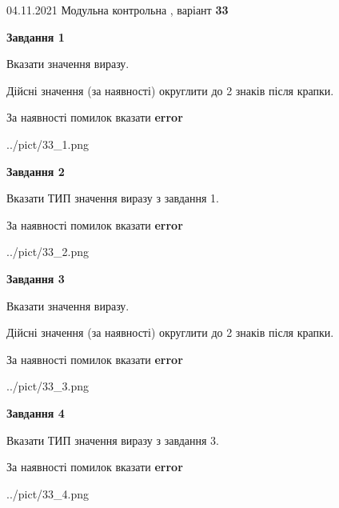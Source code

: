\documentclass[11pt, ukrainian]{article}
\begin{document}
{04.11.2021 Модульна контрольна , варіант  \No \textbf { 33 }\par}
{
\begin {large}
{\begin {center}\textbf{Завдання 1}\end {center}}\par
Вказати значення виразу. \par
Дійсні значення (за наявності) округлити до 2 знаків після крапки. \par
За наявності помилок вказати \textbf{error}

\begin{center}
	{../pict/33_1.png}
\end{center}
\newpage

{\begin {center}\textbf{Завдання 2}\end {center}}\par
Вказати ТИП значення виразу з завдання 1. \par
За наявності помилок вказати \textbf{error}

\begin{center}
	{../pict/33_2.png}
\end{center}
\newpage

{\begin {center}\textbf{Завдання 3}\end {center}}\par
Вказати значення виразу. \par
Дійсні значення (за наявності) округлити до 2 знаків після крапки. \par
За наявності помилок вказати \textbf{error}

\begin{center}
	{../pict/33_3.png}
\end{center}
\newpage

{\begin {center}\textbf{Завдання 4}\end {center}}\par
Вказати ТИП значення виразу з завдання 3. \par
За наявності помилок вказати \textbf{error}

\begin{center}
	{../pict/33_4.png}
\end{center}
\newpage


\end{large}}
\end{document}
